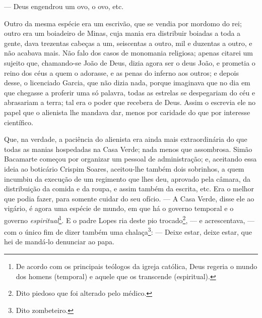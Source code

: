 --- Deus engendrou um ovo, o ovo, etc.

Outro da mesma espécie era um escrivão, que se vendia por mordomo do
rei; outro era um boiadeiro de Minas, cuja mania era distribuir boiadas
a toda a gente, dava trezentas cabeças a um, seiscentas a outro, mil e
duzentas a outro, e não acabava mais. Não falo dos casos de monomania
religiosa; apenas citarei um sujeito que, chamando-se João de Deus,
dizia agora ser o deus João, e prometia o reino dos céus a quem o
adorasse, e as penas do inferno aos outros; e depois desse, o licenciado
Garcia, que não dizia nada, porque imaginava que no dia em que chegasse
a proferir uma só palavra, todas as estrelas se despegariam do céu e
abrasariam a terra; tal era o poder que recebera de Deus. Assim o
escrevia ele no papel que o alienista lhe mandava dar, menos por
caridade do que por interesse científico.

Que, na verdade, a paciência do alienista era ainda mais extraordinária
do que todas as manias hospedadas na Casa Verde; nada menos que
assombrosa. Simão Bacamarte começou por organizar um pessoal de
administração; e, aceitando essa ideia ao boticário Crispim Soares,
aceitou-lhe também dois sobrinhos, a quem incumbiu da execução de um
regimento que lhes deu, aprovado pela câmara, da distribuição da comida
e da roupa, e assim também da escrita, etc. Era o melhor que podia
fazer, para somente cuidar do seu ofício. --- A Casa Verde, disse ele ao
vigário, é agora uma espécie de mundo, em que há o governo temporal e o
governo \emph{espiritual}\footnote{De acordo com os principais teólogos
  da igreja católica, Deus regeria o mundo dos homens (temporal) e
  aquele que os transcende (espiritual).}. E o padre Lopes ria deste pio
trocado\footnote{Dito piedoso que foi alterado pelo médico.}, --- e
acrescentava, --- com o único fim de dizer também uma chalaça\footnote{Dito
  zombeteiro.}: --- Deixe estar, deixe estar, que hei de mandá-lo
denunciar ao papa.

